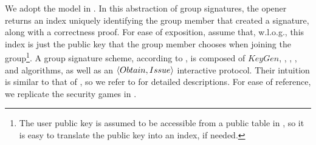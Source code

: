 We adopt the model in \cite{bsz05}. In this abstraction
of group signatures, the opener returns an index uniquely identifying the group
member that created a signature, along with a correctness proof. For ease of
exposition, assume that, w.l.o.g., this index is just the public key that the
group member chooses when joining the group\footnote{The user public key is
  assumed to be accessible from a public table in \cite{bsz05}, so it is easy
  to translate the public key into an index, if needed.}. A group signature
scheme, according to \cite{bsz05}, is composed of $KeyGen$, \UKeyGen, \Sign,
\Verify, \Open and \Judge algorithms, as well as an $\langle Obtain,Issue
\rangle$ interactive protocol. Their intuition is similar to that of
\UAS, so we refer to \cite{bsz05} for detailed descriptions. For ease of
reference, we replicate the security games in .

